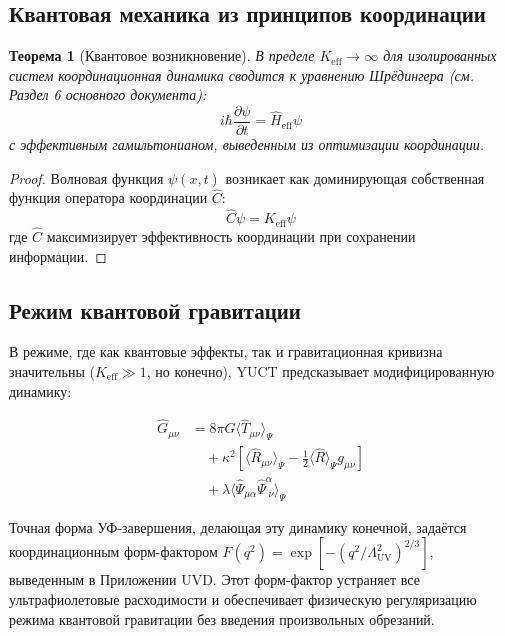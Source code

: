 \documentclass[12pt,a4paper]{article}
\newcommand{\eff}{\text{eff}}
\newtheorem{theorem}{Теорема}[section]
\theoremstyle{remark}
\newcommand{\Keff}{K_{\mathrm{eff}}}
\begin{document}
	\subsection{Квантовая механика из принципов координации}
	
	\begin{theorem}[Квантовое возникновение]
		В пределе $\Keff \to \infty$ для изолированных систем координационная динамика сводится к уравнению Шрёдингера (см. Раздел 6 основного документа):
		\[
		i\hbar \frac{\partial \psi}{\partial t} = \hat{H}_{\eff} \psi
		\]
		с эффективным гамильтонианом, выведенным из оптимизации координации.
	\end{theorem}
	
	\begin{proof}
		Волновая функция $\psi(x,t)$ возникает как доминирующая собственная функция оператора координации $\hat{C}$:
		\[
		\hat{C} \psi = \Keff \psi
		\]
		где $\hat{C}$ максимизирует эффективность координации при сохранении информации.
	\end{proof}
	
	\subsection{Режим квантовой гравитации}
	
	В режиме, где как квантовые эффекты, так и гравитационная кривизна значительны ($\Keff \gg 1$, но конечно), YUCT предсказывает модифицированную динамику:
	
	\begin{equation}
		\begin{aligned}
			\hat{G}_{\mu\nu} &= 8\pi G \langle \hat{T}_{\mu\nu} \rangle_{\Psi} \\
			&\quad + \kappa^2 \left[ \langle \hat{R}_{\mu\nu} \rangle_{\Psi} - \frac{1}{2} \langle \hat{R} \rangle_{\Psi} g_{\mu\nu} \right] \\
			&\quad + \lambda \langle \hat{\Psi}_{\mu\alpha} \hat{\Psi}^{\alpha}_{\;\nu} \rangle_{\Psi}
		\end{aligned}
	\end{equation}
	
	Точная форма УФ-завершения, делающая эту динамику конечной,
	задаётся координационным форм-фактором $F(q^2)=\exp[-(q^2/\Lambda_{\mathrm{UV}}^2)^{2/3}]$,
	выведенным в Приложении UVD. Этот форм-фактор устраняет все ультрафиолетовые
	расходимости и обеспечивает физическую регуляризацию режима квантовой гравитации
	без введения произвольных обрезаний.
	
\end{document}
